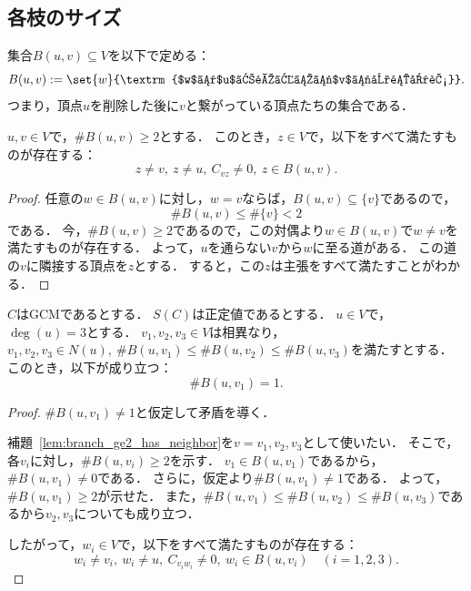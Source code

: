\subsection{各枝のサイズ}

\begin{definition}
  \label{def:branchSet}
  \lean{}
  \leanok
  集合$B(u, v) \subseteq V$を以下で定める：
  \begin{equation}
    B(u, v) := \set{w}{\textrm{$w$は$u$を通らずに$v$に到達可能}}.
  \end{equation}
  つまり，頂点$u$を削除した後に$v$と繋がっている頂点たちの集合である．
\end{definition}

\begin{lemma}
  \label{lem:branch_ge2_has_neighbor}
  \lean{}
  \leanok
  \uses{}
  $u, v \in V$で，$\# B(u, v) \ge 2$とする．
  このとき，$z \in V$で，以下をすべて満たすものが存在する：
  \begin{equation}
    z \ne v,\ z \ne u,\ C_{vz} \ne 0,\ z \in B(u, v).
  \end{equation}
\end{lemma}

\begin{proof}
  任意の$w \in B(u, v)$に対し，$w = v$ならば，$B(u, v) \subseteq \{v\}$であるので，
  \begin{equation}
    \# B(u, v) \le \# \{v\} < 2
  \end{equation}
  である．
  今，$\# B(u, v) \ge 2$であるので，この対偶より$w \in B(u, v)$で$w \ne v$を満たすものが存在する．
  よって，$u$を通らない$v$から$w$に至る道がある．
  この道の$v$に隣接する頂点を$z$とする．
  すると，この$z$は主張をすべて満たすことがわかる．
\end{proof}

\begin{theorem}
  \label{thm:smallest_branch_eq_one}
  \lean{}
  \leanok
  \uses{}
  $C$はGCMであるとする．
  $S(C)$は正定値であるとする．
  $u \in V$で，$\deg(u) = 3$とする．
  $v_1, v_2, v_3 \in V$は相異なり，$v_1, v_2, v_3 \in N(u),\ \# B(u, v_1) \le \# B(u, v_2) \le \# B(u, v_3)$を満たすとする．
  このとき，以下が成り立つ：
  \begin{equation}
    \# B(u, v_1) = 1.
  \end{equation}
\end{theorem}

\begin{proof}
  $\# B(u, v_1) \ne 1$と仮定して矛盾を導く．

  補題~\ref{lem:branch_ge2_has_neighbor}を$v = v_1, v_2, v_3$として使いたい．
  そこで，各$v_i$に対し，$\# B(u, v_i) \ge 2$を示す．
  $v_1 \in B(u, v_1)$であるから，$\# B(u, v_1) \ne 0$である．
  さらに，仮定より$\# B(u, v_1) \ne 1$である．
  よって，$\# B(u, v_1) \ge 2$が示せた．
  また，$\# B(u, v_1) \le \# B(u, v_2) \le \# B(u, v_3)$であるから$v_2, v_3$についても成り立つ．

  したがって，$w_i \in V$で，以下をすべて満たすものが存在する：
  \begin{equation}
    w_i \ne v_i,\ w_i \ne u,\ C_{v_i w_i} \ne 0,\ w_i \in B(u, v_i) \quad (i = 1, 2, 3).
  \end{equation}
\end{proof}